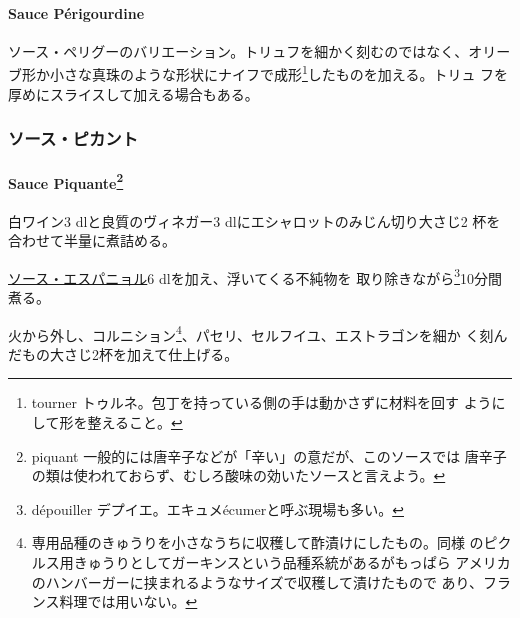 \hypertarget{sauce-puxe9rigourdine}{%
\paragraph{Sauce Périgourdine}\label{sauce-puxe9rigourdine}}


ソース・ペリグーのバリエーション。トリュフを細かく刻むのではなく、オリー
ブ形か小さな真珠のような形状にナイフで成形\footnote{tourner
  トゥルネ。包丁を持っている側の手は動かさずに材料を回す
  ようにして形を整えること。}したものを加える。トリュ
フを厚めにスライスして加える場合もある。

\maeaki

\hypertarget{ux30bdux30fcux30b9ux30d4ux30abux30f3ux30c8}{%
\subsubsection{ソース・ピカント}\label{ux30bdux30fcux30b9ux30d4ux30abux30f3ux30c8}}

\hypertarget{sauce-piquante}{%
\paragraph[Sauce Piquante]{\texorpdfstring{Sauce Piquante\footnote{piquant
  一般的には唐辛子などが「辛い」の意だが、このソースでは
  唐辛子の類は使われておらず、むしろ酸味の効いたソースと言えよう。}}{Sauce Piquante}}\label{sauce-piquante}}


白ワイン3 dlと良質のヴィネガー3 dlにエシャロットのみじん切り大さじ2
\undemi{}杯を合わせて半量に煮詰める。

\protect\hyperlink{sauce-espagnole}{ソース・エスパニョル}6
dlを加え、浮いてくる不純物を 取り除きながら\footnote{dépouiller
  デプイエ。エキュメécumerと呼ぶ現場も多い。}10分間煮る。

火から外し、コルニション\footnote{専用品種のきゅうりを小さなうちに収穫して酢漬けにしたもの。同様
  のピクルス用きゅうりとしてガーキンスという品種系統があるがもっぱら
  アメリカのハンバーガーに挟まれるようなサイズで収穫して漬けたもので
  あり、フランス料理では用いない。}、パセリ、セルフイユ、エストラゴンを細か
く刻んだもの大さじ2杯を加えて仕上げる。

